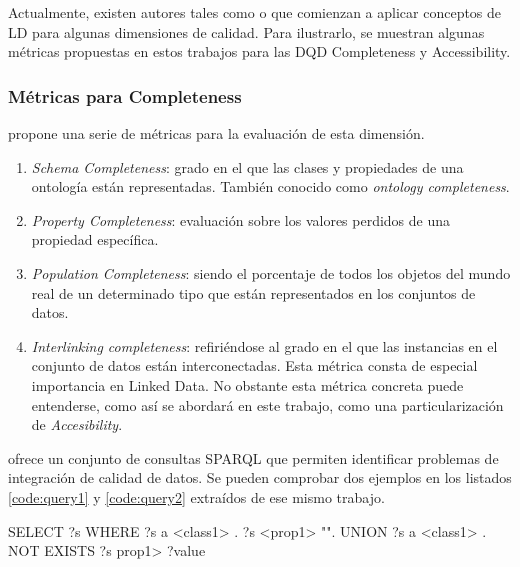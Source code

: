 Actualmente, existen autores tales como \cite{zaveri_quality_2013} o
\cite{Furber:2011:TVD:1966901.1966903} que comienzan a aplicar conceptos de
\acs{LD} para algunas dimensiones de calidad. Para ilustrarlo, se muestran
algunas métricas propuestas en estos trabajos para las \acs{DQD} Completeness y
Accessibility. 

\subsubsection{Métricas para Completeness}
\label{sec:dqassessment-completeness}
\label{metricasdq}

\cite{zaveri_quality_2013} propone una serie de métricas para la evaluación de
esta dimensión. 

\label{schemacompleteness}
\label{interlinking}
\begin{enumerate}
\item \textit{Schema Completeness}: grado en el que las clases y propiedades de
  una ontología están representadas. También conocido como \textit{ontology
    completeness}.

\item \textit{Property Completeness}: evaluación sobre los valores perdidos de
  una propiedad específica.

\item \textit{Population Completeness}: siendo el porcentaje de todos los
  objetos del mundo real de un determinado tipo que están representados en los
  conjuntos de datos. 

\item \textit{Interlinking completeness}: refiriéndose al grado en el que las
  instancias en el conjunto de datos están interconectadas. Esta métrica consta
  de especial importancia en Linked Data. No obstante esta métrica concreta
  puede entenderse, como así se abordará en este trabajo, como una
  particularización de  \textit{Accesibility}. 

\end{enumerate}

\cite{conf/ekaw/FurberH10} ofrece un conjunto de consultas
\acs{SPARQL} que permiten identificar problemas de integración de calidad de
datos. Se pueden comprobar dos ejemplos en los listados
\ref{code:query1} y \ref{code:query2} extraídos de ese mismo trabajo. 



\begin{listing}[
  float=ht,
  language = SQL,
  numbers=left,
  numberstyle=\tiny,
  stepnumber=1,
  numbersep=5pt,
  frame=single,
  caption  = {Consulta \acs{SPARQL} para identificación de literales perdidos (I)},
  label    = code:query1]
SELECT ?s 
WHERE { {
  ?s a <class1> .
  ?s <prop1> "". }
UNION{
  ?s a <class1> .
  NOT EXISTS {
  ?s prop1> ?value}}}

\end{listing}



